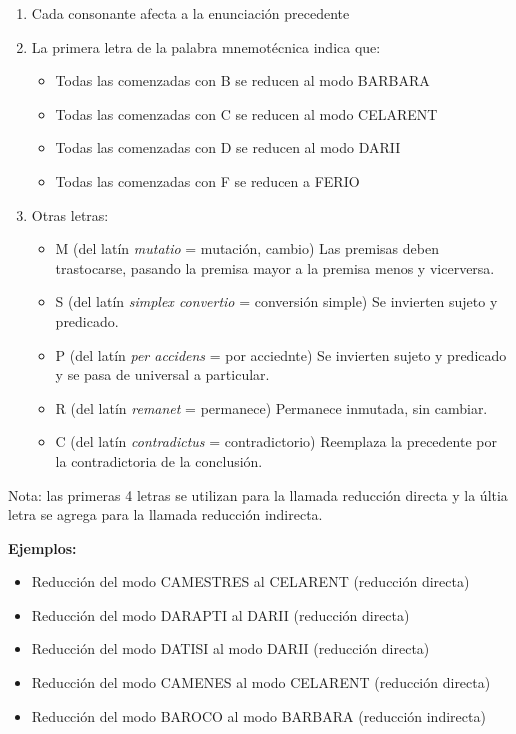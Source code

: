 \documentclass{article}
\begin{document}
  \begin{enumerate}
      \item Cada consonante afecta a la enunciación precedente
      \item La primera letra de la palabra mnemotécnica indica que:
      \begin{itemize}
           \item Todas las comenzadas con B se reducen al modo BARBARA
           \item Todas las comenzadas con C se reducen al modo CELARENT
           \item Todas las comenzadas con D se reducen al modo DARII
           \item Todas las comenzadas con F se reducen a FERIO
      \end{itemize}
      \item Otras letras:
      \begin{itemize}
          \item M (del latín \textit{mutatio} = mutación, cambio) Las premisas deben trastocarse, pasando la premisa mayor a la premisa menos y vicerversa.
          \item S (del latín \textit{simplex convertio} = conversión simple) Se invierten sujeto y predicado.
          \item P (del latín \textit{per accidens} = por acciednte) Se invierten sujeto y predicado y se pasa de universal a particular.
          \item R (del latín \textit{remanet} = permanece) Permanece inmutada, sin cambiar.
          \item C (del latín \textit{contradictus} = contradictorio) Reemplaza la precedente por la contradictoria de la conclusión.
      \end{itemize}
  \end{enumerate}
      
      Nota: las primeras 4 letras se utilizan para la llamada reducción directa y la últia letra se agrega para la llamada reducción indirecta.\\
    
      \par \textbf{Ejemplos:}
      
      \begin{itemize}
          \item Reducción del modo CAMESTRES al CELARENT (reducción directa)
          \item Reducción del modo DARAPTI al DARII (reducción directa)
          \item Reducción del modo DATISI al modo DARII (reducción directa)
          \item Reducción del modo CAMENES al modo CELARENT (reducción directa)
          \item Reducción del modo BAROCO al modo BARBARA (reducción indirecta)
      \end{itemize}
      
\end{document}
